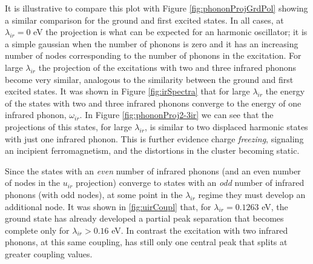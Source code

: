 It is illustrative to compare this plot with Figure \ref{fig:phononProjGrdPol} showing a similar comparison for the ground and first excited states.
In all cases, at $\lambda_{ir}=0$ eV the projection is what can be expected for an harmonic oscillator; it is a simple gaussian when the number of phonons is zero and it has an increasing number of nodes corresponding to the number of phonons in the excitation.
For large $\lambda_{ir}$ the projection of the excitations with two and three infrared phonons become very similar, analogous to the similarity between the ground and first excited states.
It was shown in Figure \ref{fig:irSpectra} that for large $\lambda_{ir}$ the energy of the states with two and three infrared phonons converge to the energy of one infrared phonon, $\omega_{ir}$.
In Figure \ref{fig:phononProj2-3ir} we can see that the projections of this states, for large $\lambda_{ir}$, is similar to two displaced harmonic states with just one infrared phonon.
This is further evidence charge \textit{freezing}, signaling an incipient ferromagnetism, and the distortions in the cluster becoming static.

Since the states with an \textit{even} number of infrared phonons (and an even number of nodes in the $u_{ir}$ projection) converge to states with an \textit{odd} number of infrared phonons (with odd nodes), at some point in the $\lambda_{ir}$ regime they must develop an additional node.
It was shown in \ref{fig:uirCoupl} that, for $\lambda_{ir}=0.1263$ eV, the ground state has already developed a partial peak separation that becomes complete only for $\lambda_{ir}>0.16$ eV.
In contrast the excitation with two infrared phonons, at this same coupling, has still only one central peak that splits at greater coupling values.